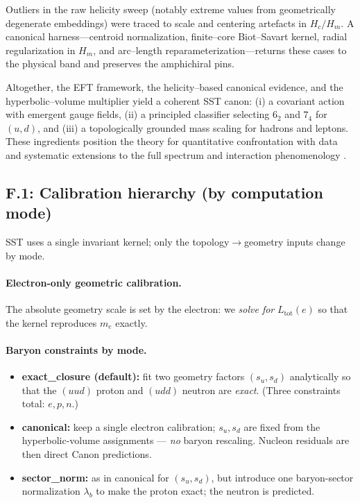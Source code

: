 \documentclass[11pt, preprint,titlepage]{revtex4-2}
\begin{document}
    Outliers in the raw helicity sweep (notably extreme values from geometrically degenerate embeddings) were traced to scale and centering artefacts in \(H_c/H_m\). A canonical harness—centroid normalization, finite–core Biot–Savart kernel, radial regularization in \(H_m\), and arc–length reparameterization—returns these cases to the physical band and preserves the amphichiral pins.

    Altogether, the EFT framework, the helicity–based canonical evidence, and the hyperbolic–volume multiplier yield a coherent SST canon: (i) a covariant action with emergent gauge fields, (ii) a principled classifier selecting \(6_2\) and \(7_4\) for \((u,d)\), and (iii) a topologically grounded mass scaling for hadrons and leptons. These ingredients position the theory for quantitative confrontation with data and systematic extensions to the full spectrum and interaction phenomenology \cite{Barcelo2011,Volovik2003,Faddeev1997,Arnold1998}.

	\subsection*{F.1: Calibration hierarchy (by computation mode)}
		SST uses a single invariant kernel; only the topology\(\to\)geometry inputs change by mode.

		\paragraph{Electron-only geometric calibration.}
		The absolute geometry scale is set by the electron: we \emph{solve for} \(L_{\text{tot}}(e)\) so that the kernel reproduces \(m_e\) exactly.

		\paragraph{Baryon constraints by mode.}
		\begin{itemize}
		\item \textbf{exact\_closure (default):} fit two geometry factors \((s_u,s_d)\) analytically so that the \((uud)\) proton and \((udd)\) neutron are \emph{exact}. (Three constraints total: \(e,p,n\).)
		\item \textbf{canonical:} keep a single electron calibration; \(s_u,s_d\) are fixed from the hyperbolic-volume assignments — \emph{no} baryon rescaling. Nucleon residuals are then direct Canon predictions.
		\item \textbf{sector\_norm:} as in canonical for \((s_u,s_d)\), but introduce one baryon-sector normalization \(\lambda_b\) to make the proton exact; the neutron is predicted.
		\end{itemize}
\end{document}
